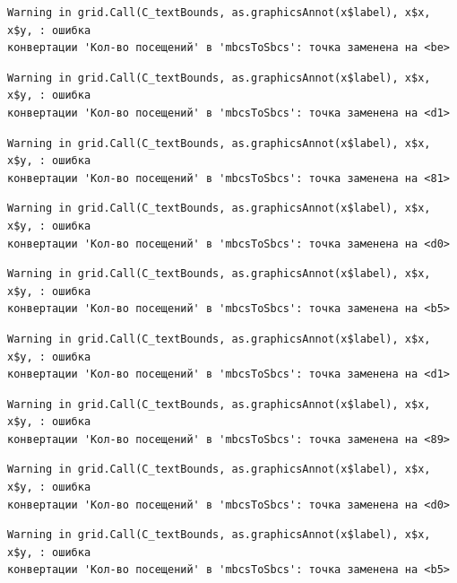 \documentclass[
  letterpaper,
  DIV=11,
  numbers=noendperiod]{scrreprt}
\begin{document}
\begin{verbatim}
Warning in grid.Call(C_textBounds, as.graphicsAnnot(x$label), x$x, x$y, : ошибка
конвертации 'Кол-во посещений' в 'mbcsToSbcs': точка заменена на <be>
\end{verbatim}

\begin{verbatim}
Warning in grid.Call(C_textBounds, as.graphicsAnnot(x$label), x$x, x$y, : ошибка
конвертации 'Кол-во посещений' в 'mbcsToSbcs': точка заменена на <d1>
\end{verbatim}

\begin{verbatim}
Warning in grid.Call(C_textBounds, as.graphicsAnnot(x$label), x$x, x$y, : ошибка
конвертации 'Кол-во посещений' в 'mbcsToSbcs': точка заменена на <81>
\end{verbatim}

\begin{verbatim}
Warning in grid.Call(C_textBounds, as.graphicsAnnot(x$label), x$x, x$y, : ошибка
конвертации 'Кол-во посещений' в 'mbcsToSbcs': точка заменена на <d0>
\end{verbatim}

\begin{verbatim}
Warning in grid.Call(C_textBounds, as.graphicsAnnot(x$label), x$x, x$y, : ошибка
конвертации 'Кол-во посещений' в 'mbcsToSbcs': точка заменена на <b5>
\end{verbatim}

\begin{verbatim}
Warning in grid.Call(C_textBounds, as.graphicsAnnot(x$label), x$x, x$y, : ошибка
конвертации 'Кол-во посещений' в 'mbcsToSbcs': точка заменена на <d1>
\end{verbatim}

\begin{verbatim}
Warning in grid.Call(C_textBounds, as.graphicsAnnot(x$label), x$x, x$y, : ошибка
конвертации 'Кол-во посещений' в 'mbcsToSbcs': точка заменена на <89>
\end{verbatim}

\begin{verbatim}
Warning in grid.Call(C_textBounds, as.graphicsAnnot(x$label), x$x, x$y, : ошибка
конвертации 'Кол-во посещений' в 'mbcsToSbcs': точка заменена на <d0>
\end{verbatim}

\begin{verbatim}
Warning in grid.Call(C_textBounds, as.graphicsAnnot(x$label), x$x, x$y, : ошибка
конвертации 'Кол-во посещений' в 'mbcsToSbcs': точка заменена на <b5>
\end{verbatim}
\end{document}
